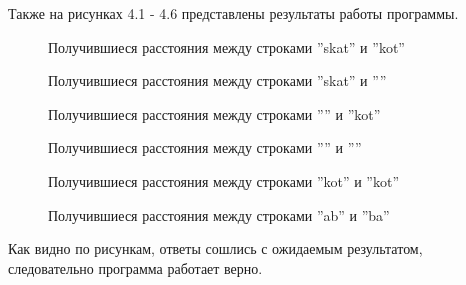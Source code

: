 Также на рисунках 4.1 - 4.6 представлены результаты работы программы.
\begin{figure}
	\caption{Получившиеся расстояния между строками ''skat'' и ''kot''}
	\caption{Получившиеся расстояния между строками ''skat'' и ''''}
\end{figure}
\begin{figure}
	\caption{Получившиеся расстояния между строками '''' и ''kot''}
	\caption{Получившиеся расстояния между строками '''' и ''''}
	\caption{Получившиеся расстояния между строками ''kot'' и ''kot''}
	\caption{Получившиеся расстояния между строками ''ab'' и ''ba''}
\end{figure}

\newpage
Как видно по рисункам, ответы сошлись с ожидаемым результатом, следовательно программа работает верно.


